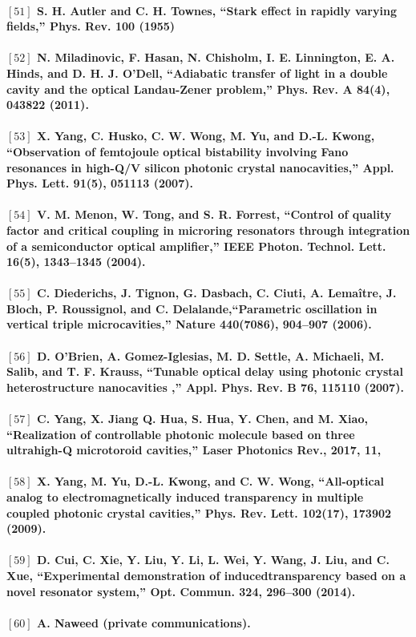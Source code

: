 \paragraph{\normalfont \large $[51]$ S. H. Autler and C. H. Townes, “Stark effect in rapidly varying fields,” Phys. Rev. \textbf{100} (1955) \\ 
\\$[52]$  N. Miladinovic, F. Hasan, N. Chisholm, I. E. Linnington, E. A. Hinds, and D. H. J. O’Dell, “Adiabatic transfer of light in a double cavity and the optical Landau-Zener problem,” Phys. Rev. A \textbf{84}(4), 043822 (2011).\\
\\$[53]$ X. Yang, C. Husko, C. W. Wong, M. Yu, and D.-L. Kwong, “Observation of femtojoule optical bistability
involving Fano resonances in high-Q/V silicon photonic crystal nanocavities,” Appl. Phys. Lett. \textbf{91}(5), 051113
(2007).\\
\\$[54]$  V. M. Menon, W. Tong, and S. R. Forrest, “Control of quality factor and critical coupling in microring resonators
through integration of a semiconductor optical amplifier,” IEEE Photon. Technol. Lett. \textbf{16}(5), 1343–1345 (2004).\\
\\$[55]$ C. Diederichs, J. Tignon, G. Dasbach, C. Ciuti, A. Lemaître, J. Bloch, P. Roussignol, and C. Delalande,“Parametric oscillation in vertical triple microcavities,” Nature \textbf{440}(7086), 904–907 (2006).\\
\\$[56]$ D. O’Brien, A. Gomez-Iglesias, M. D. Settle, A. Michaeli, M. Salib, and T. F. Krauss, “Tunable optical delay using photonic crystal heterostructure nanocavities ,” Appl. Phys. Rev. B \textbf{76}, 115110 (2007).\\
\\$[57]$ C. Yang,  X. Jiang Q. Hua, S. Hua, Y. Chen, and M. Xiao, “Realization of controllable photonic molecule based on three ultrahigh-Q microtoroid cavities,” Laser Photonics Rev., 2017, \textbf{11},\\
\\$[58]$ X. Yang, M. Yu, D.-L. Kwong, and C. W. Wong, “All-optical analog to electromagnetically induced
transparency in multiple coupled photonic crystal cavities,” Phys. Rev. Lett. \textbf{102}(17), 173902 (2009).\\
\\$[59]$ D. Cui, C. Xie, Y. Liu, Y. Li, L. Wei, Y. Wang, J. Liu, and C. Xue, “Experimental demonstration of inducedtransparency based on a novel resonator system,” Opt. Commun. 324, 296–300 (2014).\\
\\$[60]$ A. Naweed (private communications).}